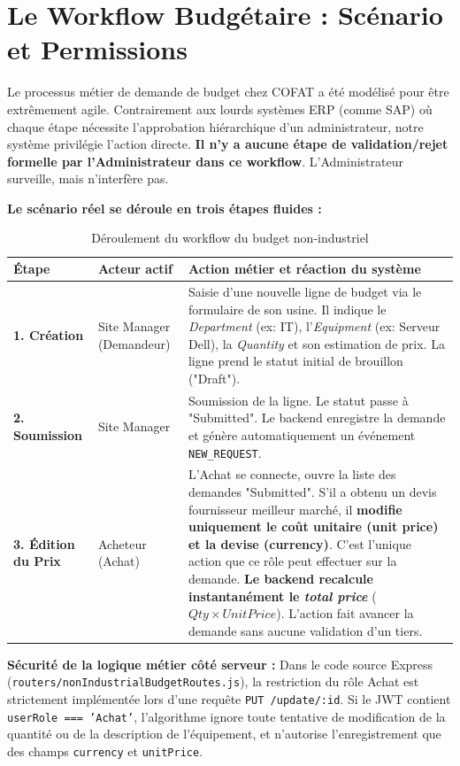 \section{Le Workflow Budgétaire : Scénario et Permissions}
Le processus métier de demande de budget chez COFAT a été modélisé pour être extrêmement agile. Contrairement aux lourds systèmes ERP (comme SAP) où chaque étape nécessite l'approbation hiérarchique d'un administrateur, notre système privilégie l'action directe. \textbf{Il n'y a aucune étape de validation/rejet formelle par l'Administrateur dans ce workflow}. L'Administrateur surveille, mais n'interfère pas.

\textbf{Le scénario réel se déroule en trois étapes fluides :}

\begin{table}[h]
\centering
\begin{tabular}{|p{2cm}|p{3.5cm}|p{9.5cm}|}
\hline
\textbf{Étape} & \textbf{Acteur actif} & \textbf{Action métier et réaction du système} \\ \hline
\textbf{1. Création} & Site Manager (Demandeur) & Saisie d'une nouvelle ligne de budget via le formulaire de son usine. Il indique le \textit{Department} (ex: IT), l'\textit{Equipment} (ex: Serveur Dell), la \textit{Quantity} et son estimation de prix. La ligne prend le statut initial de brouillon ("Draft"). \\ \hline
\textbf{2. Soumission} & Site Manager & Soumission de la ligne. Le statut passe à "Submitted". Le backend enregistre la demande et génère automatiquement un événement \texttt{NEW\_REQUEST}. \\ \hline
\textbf{3. Édition du Prix} & Acheteur (Achat) & L'Achat se connecte, ouvre la liste des demandes "Submitted". S'il a obtenu un devis fournisseur meilleur marché, il \textbf{modifie uniquement le coût unitaire (unit price) et la devise (currency)}. C'est l'unique action que ce rôle peut effectuer sur la demande. \textbf{Le backend recalcule instantanément le \textit{total price}} ($Qty \times UnitPrice$). L'action fait avancer la demande sans aucune validation d'un tiers. \\ \hline
\end{tabular}
\caption{Déroulement du workflow du budget non-industriel}
\label{tab:workflow_budget}
\end{table}

\textbf{Sécurité de la logique métier côté serveur :} 
Dans le code source Express (\texttt{routers/nonIndustrialBudgetRoutes.js}), la restriction du rôle Achat est strictement implémentée lors d'une requête \texttt{PUT /update/:id}. Si le JWT contient \texttt{userRole === 'Achat'}, l'algorithme ignore toute tentative de modification de la quantité ou de la description de l'équipement, et n'autorise l'enregistrement que des champs \texttt{currency} et \texttt{unitPrice}.

